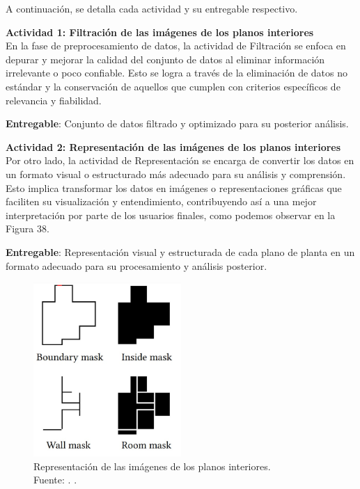 A continuación, se detalla cada actividad y su entregable respectivo.

\textbf{Actividad 1: Filtración de las imágenes de los planos interiores}
\\
En la fase de preprocesamiento de datos, la actividad de Filtración se enfoca en depurar y mejorar la calidad del conjunto de datos al eliminar información irrelevante o poco confiable. Esto se logra a través de la eliminación de datos no estándar y la conservación de aquellos que cumplen con criterios específicos de relevancia y fiabilidad. 

\textbf{Entregable}: Conjunto de datos filtrado y optimizado para su posterior análisis.

\textbf{Actividad 2: Representación de las imágenes de los planos interiores}
\\
Por otro lado, la actividad de Representación se encarga de convertir los datos en un formato visual o estructurado más adecuado para su análisis y comprensión. Esto implica transformar los datos en imágenes o representaciones gráficas que faciliten su visualización y entendimiento, contribuyendo así a una mejor interpretación por parte de los usuarios finales, como podemos observar en la Figura 38.

\textbf{Entregable}: Representación visual y estructurada de cada plano de planta en un formato adecuado para su procesamiento y análisis posterior.

\begin{figure}[h]
    \begin{center}
        \includegraphics[width=0.5\textwidth]{3/figures/Representacion_planos.jpg}
        \caption[Representación de las imágenes de los planos interiores]{Representación de las imágenes de los planos interiores.\\
        Fuente: \cite{art_wu2019interior}. .}
        \label{3:fig3}
    \end{center}
\end{figure}

